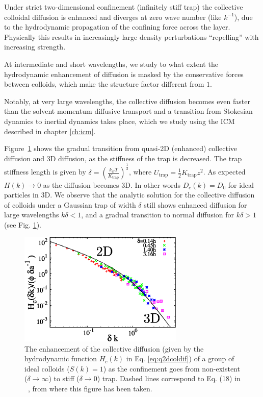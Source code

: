 \documentclass[twoside,openright,titlepage,numbers=noenddot,%
headinclude,footinclude,cleardoublepage=empty,abstract=on,
BCOR=5mm,fontsize=11pt, dvipsnames, paper=b5
]{scrreprt}
\newcommand{\kT}{k_B T}
\newcommand{\half}{\frac{1}{2}}
\begin{document}
Under strict two-dimensional confinement (infinitely stiff trap) the collective colloidal diffusion is enhanced and diverges at zero wave number (like $k^{-1}$), due to the hydrodynamic propagation of the confining force across the layer. Physically this results in increasingly large density perturbations ``repelling'' with increasing strength.


At intermediate and short wavelengths, we study to what extent the hydrodynamic enhancement of diffusion is masked by the conservative forces between colloids, which make the structure factor different from $1$. 

Notably, at very large wavelengths, the collective diffusion becomes even faster than the solvent momentum diffusive transport and a transition from Stokesian dynamics to inertial dynamics takes place, which we study using the \gls{ICM} described in chapter \ref{ch:icm}.

Figure~\ref{fig:q2Dfrom3dto2d} shows the gradual transition from quasi-2D (enhanced) collective diffusion and 3D diffusion, as the stiffness of the trap is decreased. The trap stiffness length is given by $\delta = \left(\frac{\kT}{K_{\text{trap}}}\right)^{\half}$, where $U_{\text{trap}} = \half K_{\text{trap}} z^2$. As expected $H(k)\rightarrow0$ as the diffusion becomes 3D. In other words $D_c(k) = D_0$ for ideal particles in 3D. We observe that the analytic solution for the collective diffusion of colloids under a Gaussian trap of width $\delta$ still shows enhanced diffusion for large wavelengths $k\delta < 1$, and a gradual transition to normal diffusion for $k\delta > 1$ (see Fig. \ref{fig:q2Dfrom3dto2d}).

\begin{figure}[H]
  \centering
  \includegraphics[width=0.7\textwidth]{gfx/q2Dfrom3dto2d}
  \caption[ ]{The enhancement of the collective diffusion (given by the hydrodynamic function $H_c(k)$ in Eq. \ref{eq:q2dcoldif}) of a group of ideal colloids ($S(k)=1$) as the confinement goes from non-existent ($\delta\rightarrow \infty$) to stiff ($\delta\rightarrow 0$) trap. Dashed lines correspond to Eq. (18) in ~\cite{Pelaez2017}, from where this figure has been taken.}
  \label{fig:q2Dfrom3dto2d}
\end{figure}
\end{document}
